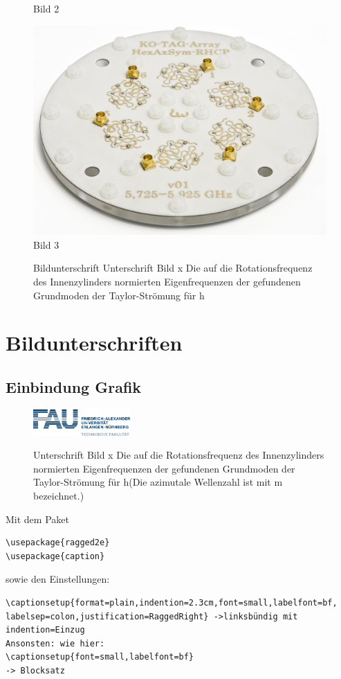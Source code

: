 \documentclass{like}
\begin{document}
\begin{figure}[h!]
\begin{minipage}[t]{0.3\textwidth}
Bild 2
\end{minipage}
\hspace*{0.2cm}
\begin{minipage}[t]{0.3\textwidth}
\includegraphics[width=\textwidth]{Abbildungen/peilantenne_c-band_bottom.png}
Bild 3
\end{minipage}
\caption{Bildunterschrift Unterschrift Bild x Die auf die Rotationsfrequenz des Innenzylinders normierten Eigenfrequenzen der gefundenen Grundmoden der Taylor-Strömung für h}
  \end{figure}




\section{Bildunterschriften}
 \subsection*{Einbindung Grafik}
  \begin{figure}[h!]
  \begin{centering}
  {\includegraphics[width=0.33\textwidth]{Abbildungen/fau.png}}
   \caption{Unterschrift Bild x Die auf die Rotationsfrequenz des Innenzylinders normierten Eigenfrequenzen der gefundenen Grundmoden der Taylor-Strömung für h(Die azimutale Wellenzahl ist mit m  bezeichnet.)}
  \end{centering}
  \end{figure}
Mit dem Paket
\begin{verbatim}
\usepackage{ragged2e}
\usepackage{caption}
\end{verbatim}
sowie den Einstellungen:
\begin{verbatim}
\captionsetup{format=plain,indention=2.3cm,font=small,labelfont=bf,
labelsep=colon,justification=RaggedRight} ->linksbündig mit 
indention=Einzug
Ansonsten: wie hier:
\captionsetup{font=small,labelfont=bf}
-> Blocksatz
\end{verbatim}
\end{document}
